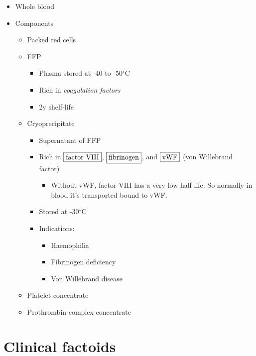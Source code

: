 \documentclass[
  12pt,
]{memoir}
\providecommand{\tightlist}{%
  \setlength{\itemsep}{0pt}\setlength{\parskip}{0pt}}
\begin{document}
\begin{itemize}
\tightlist
\item
  Whole blood
\item
  Components

  \begin{itemize}
  \tightlist
  \item
    Packed red cells
  \item
    FFP

    \begin{itemize}
    \tightlist
    \item
      Plasma stored at -40 to -50\(^\circ\)C
    \item
      Rich in \emph{coagulation factors}
    \item
      2y shelf-life
    \end{itemize}
  \item
    Cryoprecipitate

    \begin{itemize}
    \tightlist
    \item
      Supernatant of FFP
    \item
      Rich in \(\fbox{factor VIII}\), \(\fbox{fibrinogen}\), and
      \(\fbox{vWF}\) (von Willebrand factor)

      \begin{itemize}
      \tightlist
      \item
        Without vWF, factor VIII has a very low half life. So normally
        in blood it's transported bound to vWF.
      \end{itemize}
    \item
      Stored at -30\(^\circ\)C
    \item
      Indications:

      \begin{itemize}
      \tightlist
      \item
        Haemophilia
      \item
        Fibrinogen deficiency
      \item
        Von Willebrand disease
      \end{itemize}
    \end{itemize}
  \item
    Platelet concentrate
  \item
    Prothrombin complex concentrate
  \end{itemize}
\end{itemize}

\hypertarget{clinical-factoids}{%
\section{Clinical factoids}\label{clinical-factoids}}
\end{document}
